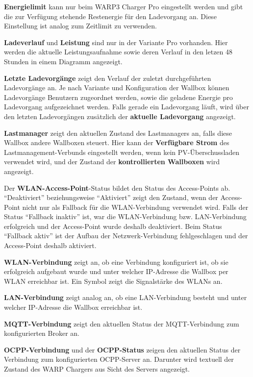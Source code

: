 \documentclass[a4paper,10pt]{article}
\begin{document}
\begin{multicols*}{2}
    \textbf{Energielimit} kann nur beim WARP3 Charger Pro eingestellt werden und gibt die zur Verfügung stehende Restenergie für den
    Ladevorgang an. Diese Einstellung ist analog zum Zeitlimit zu verwenden.

    \textbf{Ladeverlauf} und \textbf{Leistung} sind nur in der Variante Pro
    vorhanden. Hier werden die aktuelle Leistungsaufnahme sowie deren Verlauf in den letzen 48 Stunden in einem Diagramm angezeigt.

    \textbf{Letzte Ladevorgänge} zeigt den Verlauf der zuletzt durchgeführten
	Ladevorgänge an. Je nach Variante und Konfiguration der Wallbox können Ladevorgänge Benutzern
	zugeordnet werden, sowie die geladene Energie pro Ladevorgang aufgezeichnet werden. Falls gerade ein Ladevorgang läuft,
	wird über den letzten Ladevorgängen zusätzlich der \textbf{aktuelle Ladevorgang} angezeigt.

    \textbf{Lastmanager} zeigt den aktuellen Zustand des Lastmanagers an, falls diese Wallbox
    andere Wallboxen steuert. Hier kann der \textbf{Verfügbare Strom} des Lastmanagement-Verbunds
    eingestellt werden, wenn kein PV-Überschussladen verwendet wird, und der Zustand der \textbf{kontrollierten Wallboxen} wird angezeigt.


    Der \textbf{WLAN-Access-Point}-Status bildet den Status des Access-Points ab.
    \enquote{Deaktiviert} beziehungsweise \enquote{Aktiviert} zeigt den Zustand, wenn der Access-Point nicht
    nur als Fallback für die WLAN-Verbindung verwendet wird. Falls der Status \enquote{Fallback inaktiv} ist,
    war die WLAN-Verbindung bzw. LAN-Verbindung erfolgreich und der Access-Point wurde deshalb deaktiviert.
    Beim Status \enquote{Fallback aktiv} ist der Aufbau der Netzwerk-Verbindung fehlgeschlagen und der
    Access-Point deshalb aktiviert.

    \textbf{WLAN-Verbindung} zeigt an, ob eine Verbindung konfiguriert ist, ob sie erfolgreich aufgebaut wurde und
    unter welcher IP-Adresse die Wallbox per WLAN erreichbar ist. Ein Symbol
    zeigt die Signalstärke des WLANs an.

    \textbf{LAN-Verbindung} zeigt analog an, ob eine LAN-Verbindung besteht und unter welcher IP-Adresse die Wallbox erreichbar ist.

    \textbf{MQTT-Verbindung} zeigt den aktuellen Status der MQTT-Verbindung
    zum konfigurierten Broker an.

    \textbf{OCPP-Verbindung} und der \textbf{OCPP-Status} zeigen den aktuellen Status der Verbindung zum konfigurierten OCPP-Server an.
    Darunter wird textuell der Zustand des WARP Chargers aus Sicht des Servers angezeigt.


\end{multicols*}
\end{document}
